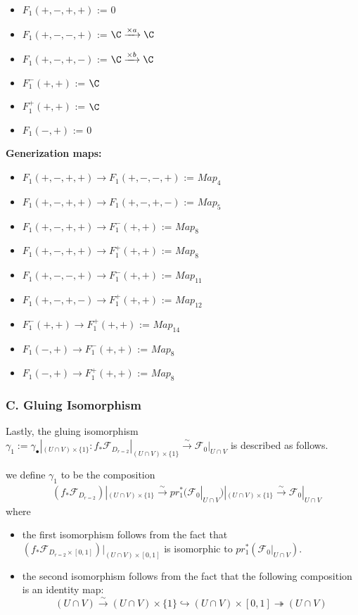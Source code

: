 \begin{itemize}
\item $F_1(+,-,+,+)$ := $0$
\item $F_1(+,-,-,+)$ := $\C \xrightarrow{\times a} \C $
\item $F_1(+,-,+,-)$ := $\C \xrightarrow{\times b} \C $
\item $F_1^-(+,+)$ := $\C$
\item $F_1^+(+,+)$ := $\C$
\item $F_1(-,+)$ := $0$
\end{itemize}
\textbf{Generization maps:}

\begin{itemize}
\item $F_1(+,-,+,+)\rightarrow F_1(+,-,-,+)$ := $Map_4$
\item $F_1(+,-,+,+)\rightarrow F_1(+,-,+,-)$ := $Map_5$
\item $F_1(+,-,+,+)\rightarrow F_1^-(+,+)$ := $Map_8$
\item $F_1(+,-,+,+)\rightarrow F_1^+(+,+)$ := $Map_8$
\item $F_1(+,-,-,+)\rightarrow F_1^-(+,+)$ := $Map_{11}$
\item $F_1(+,-,+,-)\rightarrow F_1^+(+,+)$ := $Map_{12}$
\item $F_1^-(+,+)\rightarrow F_1^+(+,+)$ := $Map_{14}$
\item $F_1(-,+)\rightarrow F_1^-(+,+)$ := $Map_8$
\item $F_1(-,+)\rightarrow F_1^+(+,+)$ := $Map_8$
\end{itemize}

\subsubsection{C. Gluing Isomorphism}
Lastly, the gluing isomorphism $\gamma_1 := \gamma_\bullet|_{(U\cap V)\times \{1\}}:  f_*\mathscr{F}_{D_{r=2}}|_{(U\cap V)\times \{1\}}\xrightarrow{\sim} \mathscr{F}_0|_{U\cap V}$ is described as follows.

\begin{definition}
we define $\gamma_1$ to be the composition
\begin{align*}
&(f_*\mathscr{F}_{D_{r=2}})|_{(U\cap V)\times \{1\}}\xrightarrow{\sim}pr_1^*(\mathscr{F}_0|_{U\cap V})|_{(U\cap V)\times \{1\}}\xrightarrow{\sim}\mathscr{F}_0|_{U\cap V}
\end{align*}
where
\begin{itemize}
\item the first isomorphism follows from the fact that $(f_*\mathscr{F}_{D_{r=2}\times [0,1]})|_{(U\cap V)\times[0,1]}$ is isomorphic to $pr_1^*(\mathscr{F}_0|_{U\cap V})$.

\item the second isomorphism follows from the fact that the following composition is an identity map:
\[
(U\cap V)\xrightarrow{\sim} (U\cap V)\times \{1\} \hookrightarrow (U\cap V)\times [0,1] \twoheadrightarrow (U\cap V)
\]
\end{itemize}
\end{definition}